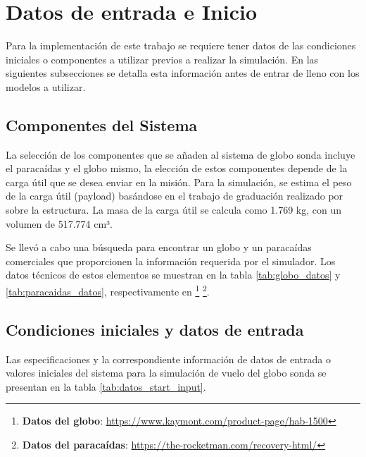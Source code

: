 \newpage

\section{Datos de entrada e Inicio}

Para la implementación de este trabajo se requiere tener datos de las condiciones iniciales o componentes a utilizar previos a realizar la simulación. En las siguientes subsecciones se detalla esta información antes de  entrar de lleno con los modelos a utilizar.

\subsection{Componentes del Sistema}

La selección de los componentes que se añaden al sistema de globo sonda incluye el paracaídas y el globo mismo, la elección de estos componentes depende de la carga útil que se desea enviar en la misión. Para la simulación, se estima el peso de la carga útil (payload) basándose en el trabajo de graduación realizado por \cite{tesis_estructura_stratoballoon} sobre la estructura. La masa de la carga útil se calcula como 1.769 kg, con un volumen de 517.774 cm³.

Se llevó a cabo una búsqueda para encontrar un globo y un paracaídas comerciales que proporcionen la información requerida por el simulador. Los datos técnicos de estos elementos se muestran en la tabla \ref{tab:globo_datos} y \ref{tab:paracaidas_datos}, respectivamente en \footnote{\textbf{Datos del globo}: \url{https://www.kaymont.com/product-page/hab-1500}} \footnote{\textbf{Datos del paracaídas}: \url{https://the-rocketman.com/recovery-html/}}.

\vspace{0.7cm}

\vspace{0.7cm}


\newpage

\subsection{Condiciones iniciales y datos de entrada}

Las especificaciones  y la correspondiente información de datos de entrada o valores iniciales del sistema para la simulación de vuelo del globo sonda se presentan en la tabla \ref{tab:datos_start_input}. 

